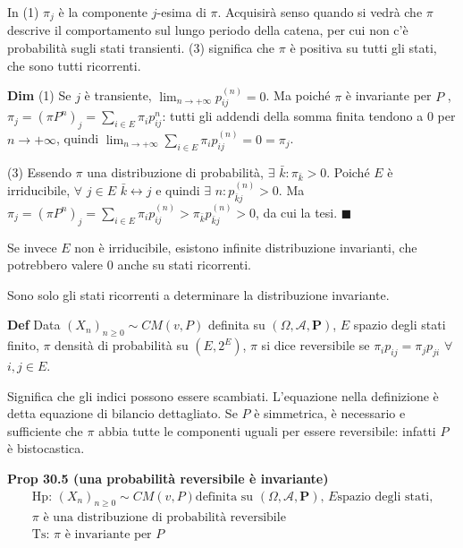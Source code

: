 \documentclass{article}
\begin{document}
In (1) $\pi _{j}$ \`{e} la componente $j$-esima di $\pi $. Acquisir\`{a} senso quando si vedr\`{a} che $\pi $ descrive
il comportamento sul lungo periodo della catena, per cui non c'\`{e}
probabilit\`{a} sugli stati transienti. (3) significa che $\pi $ \`{e}
positiva su tutti gli stati, che sono tutti ricorrenti.

\textbf{Dim} (1) Se $j$ \`{e} transiente, $\lim_{n\rightarrow +\infty
}p_{ij}^{\left( n\right) }=0$. Ma poich\'{e} $\pi $ \`{e} invariante per $P$%
, $\pi _{j}=\left( \pi P^{n}\right) _{j}=\sum_{i\in E}\pi _{i}p_{ij}^{n}$:
tutti gli addendi della somma finita tendono a $0$ per $n\rightarrow +\infty 
$, quindi $\lim_{n\rightarrow +\infty }\sum_{i\in E}\pi _{i}p_{ij}^{\left(
n\right) }=0=\pi _{j}$.

(3) Essendo $\pi $ una distribuzione di probabilit\`{a}, $\exists $ $\bar{k}%
:\pi _{\bar{k}}>0$. Poich\'{e} $E$ \`{e} irriducibile, $\forall $ $j\in E$ $%
\bar{k}\leftrightarrow j$ e quindi $\exists $ $n:p_{\bar{k}j}^{\left(
n\right) }>0$. Ma $\pi _{j}=\left( \pi P^{n}\right) _{j}=\sum_{i\in E}\pi
_{i}p_{ij}^{\left( n\right) }>\pi _{\bar{k}}p_{\bar{k}j}^{\left( n\right)
}>0 $, da cui la tesi. $\blacksquare $

Se invece $E$ non \`{e} irriducibile, esistono infinite distribuzione
invarianti, che potrebbero valere $0$ anche su stati ricorrenti.

Sono solo gli stati ricorrenti a determinare la distribuzione invariante.

\textbf{Def} Data $\left( X_{n}\right) _{n\geq 0}\sim CM\left( v,P\right) $
definita su $\left( \Omega ,\mathcal{A},\mathbf{P}\right) $, $E$ spazio
degli stati finito, $\pi $ densit\`{a} di probabilit\`{a} su $\left(
E,2^{E}\right) $, $\pi $ si dice reversibile se $\pi _{i}p_{ij}=\pi
_{j}p_{ji}$ $\forall $ $i,j\in E$.

Significa che gli indici possono essere scambiati. L'equazione nella
definizione \`{e} detta equazione di bilancio dettagliato. Se $P$ \`{e}
simmetrica, \`{e} necessario e sufficiente che $\pi $ abbia tutte le
componenti uguali per essere reversibile: infatti $P$ \`{e} bistocastica.

\textbf{Prop 30.5 (una probabilit\`{a} reversibile \`{e} invariante)}%
\begin{gather*}
\text{Hp: }\left( X_{n}\right) _{n\geq 0}\sim CM\left( v,P\right) \text{
definita su }\left( \Omega ,\mathcal{A},\mathbf{P}\right) \text{, }E\text{
spazio degli stati,} \\
\pi \text{ \`{e} una distribuzione di probabilit\`{a} reversibile} \\
\text{Ts: }\pi \text{ \`{e} invariante per }P
\end{gather*}
\end{document}
